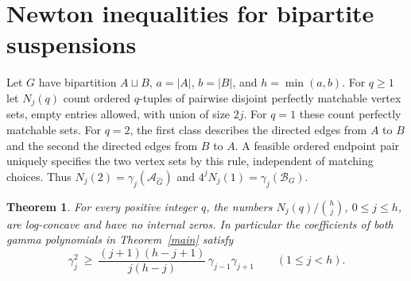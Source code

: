 \documentclass[11pt]{article}
\newtheorem{theorem}{Theorem}[section]
\newcommand{\A}{\mathcal A}
\newcommand{\B}{\mathcal B}
\begin{document}
\section{Newton inequalities for bipartite suspensions}
Let $G$ have bipartition $A\sqcup B$, $a=|A|$, $b=|B|$, and $h=\min(a,b)$. For $q\ge1$ let $N_j(q)$ count ordered $q$-tuples of pairwise disjoint perfectly matchable vertex sets, empty entries allowed, with union of size $2j$. For $q=1$ these count perfectly matchable sets. For $q=2$, the first class describes the directed edges from $A$ to $B$ and the second the directed edges from $B$ to $A$. A feasible ordered endpoint pair uniquely specifies the two vertex sets by this rule, independent of matching choices. Thus $N_j(2)=\gamma_j(\A_{\widehat G})$ and $4^jN_j(1)=\gamma_j(\B_G)$.

\begin{theorem}\label{newton}
For every positive integer $q$, the numbers $N_j(q)/\binom hj$, $0\le j\le h$, are log-concave and have no internal zeros. In particular the coefficients of both gamma polynomials in Theorem~\ref{main} satisfy
\[
 \gamma_j^2\ \ge\ \frac{(j+1)(h-j+1)}{j(h-j)}\,\gamma_{j-1}\gamma_{j+1}
 \qquad(1\le j<h).
\]
\end{theorem}
\end{document}
